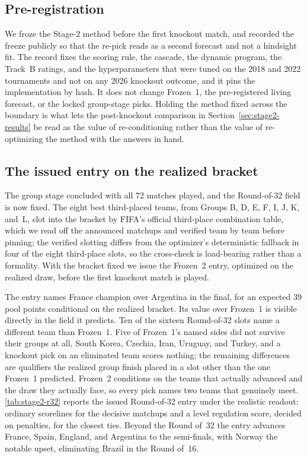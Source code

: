 \subsection{Pre-registration}\label{sec:stage2-prereg}

We froze the Stage-2 method before the first knockout match, and recorded the
freeze publicly so that the re-pick reads as a second forecast and not a
hindsight fit. The record fixes the scoring rule, the cascade, the dynamic
program, the Track~B ratings, and the hyperparameters that were tuned on the
2018 and 2022 tournaments and not on any 2026 knockout outcome, and it pins the
implementation by hash. It does not change Frozen~1, the pre-registered living
forecast, or the locked group-stage picks. Holding the method fixed across the
boundary is what lets the post-knockout comparison in
Section~\ref{sec:stage2-results} be read as the value of re-conditioning rather
than the value of re-optimizing the method with the answers in hand.

\subsection{The issued entry on the realized bracket}\label{sec:stage2-entry}

The group stage concluded with all 72 matches played, and the Round-of-32 field
is now fixed. The eight best third-placed teams, from Groups B, D, E, F, I, J, K,
and~L, slot into the bracket by FIFA's official third-place combination table,
which we read off the announced matchups and verified team by team before
pinning; the verified slotting differs from the optimizer's deterministic
fallback in four of the eight third-place slots, so the cross-check is
load-bearing rather than a formality. With the bracket fixed we issue the
Frozen~2 entry, optimized on the realized draw, before the first knockout match
is played.

The entry names France champion over Argentina in the final, for an expected 39
pool points conditional on the realized bracket. Its value over Frozen~1 is
visible directly in the field it predicts. Ten of the sixteen Round-of-32 slots
name a different team than Frozen~1. Five of Frozen~1's named sides did not
survive their groups at all, South Korea, Czechia, Iran, Uruguay, and Turkey, and
a knockout pick on an eliminated team scores nothing; the remaining differences
are qualifiers the realized group finish placed in a slot other than the one
Frozen~1 predicted. Frozen~2 conditions on the teams that actually advanced and
the draw they actually face, so every pick names two teams that genuinely meet.
\autoref{tab:stage2-r32} reports the issued Round-of-32 entry under the realistic
readout: ordinary scorelines for the decisive matchups and a level regulation
score, decided on penalties, for the closest ties. Beyond the Round of~32 the
entry advances France, Spain, England, and Argentina to the semi-finals, with
Norway the notable upset, eliminating Brazil in the Round of~16.

